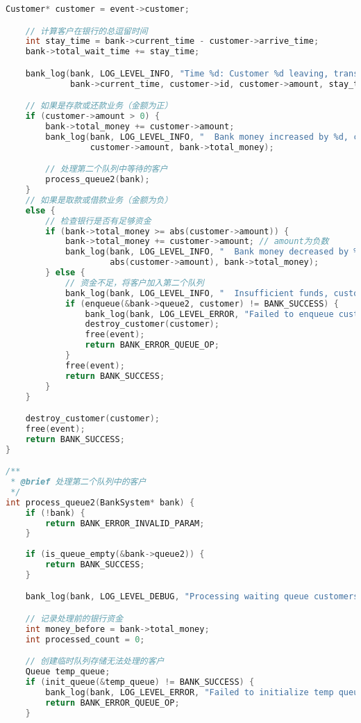 \documentclass[12pt,a4paper]{article}
\begin{document}
\begin{lstlisting}[language=C,caption=bank\_simulation.c]
    Customer* customer = event->customer;

    // 计算客户在银行的总逗留时间
    int stay_time = bank->current_time - customer->arrive_time;
    bank->total_wait_time += stay_time;

    bank_log(bank, LOG_LEVEL_INFO, "Time %d: Customer %d leaving, transaction amount %d, total stay time %d", 
             bank->current_time, customer->id, customer->amount, stay_time);

    // 如果是存款或还款业务（金额为正）
    if (customer->amount > 0) {
        bank->total_money += customer->amount;
        bank_log(bank, LOG_LEVEL_INFO, "  Bank money increased by %d, current total %d", 
                 customer->amount, bank->total_money);

        // 处理第二个队列中等待的客户
        process_queue2(bank);
    } 
    // 如果是取款或借款业务（金额为负）
    else {
        // 检查银行是否有足够资金
        if (bank->total_money >= abs(customer->amount)) {
            bank->total_money += customer->amount; // amount为负数
            bank_log(bank, LOG_LEVEL_INFO, "  Bank money decreased by %d, current total %d", 
                     abs(customer->amount), bank->total_money);
        } else {
            // 资金不足，将客户加入第二个队列
            bank_log(bank, LOG_LEVEL_INFO, "  Insufficient funds, customer %d added to waiting queue", customer->id);
            if (enqueue(&bank->queue2, customer) != BANK_SUCCESS) {
                bank_log(bank, LOG_LEVEL_ERROR, "Failed to enqueue customer %d to waiting queue", customer->id);
                destroy_customer(customer);
                free(event);
                return BANK_ERROR_QUEUE_OP;
            }
            free(event);
            return BANK_SUCCESS;
        }
    }

    destroy_customer(customer);
    free(event);
    return BANK_SUCCESS;
}

/**
 * @brief 处理第二个队列中的客户
 */
int process_queue2(BankSystem* bank) {
    if (!bank) {
        return BANK_ERROR_INVALID_PARAM;
    }
    
    if (is_queue_empty(&bank->queue2)) {
        return BANK_SUCCESS;
    }

    bank_log(bank, LOG_LEVEL_DEBUG, "Processing waiting queue customers");

    // 记录处理前的银行资金
    int money_before = bank->total_money;
    int processed_count = 0;

    // 创建临时队列存储无法处理的客户
    Queue temp_queue;
    if (init_queue(&temp_queue) != BANK_SUCCESS) {
        bank_log(bank, LOG_LEVEL_ERROR, "Failed to initialize temp queue");
        return BANK_ERROR_QUEUE_OP;
    }


\end{lstlisting}
\end{document}

